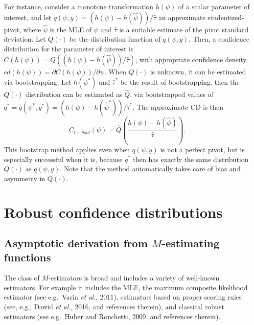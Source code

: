 \documentclass[preprint,12pt,authoryear]{elsarticle}
\begin{document}
For instance, consider  a monotone transformation $h(\psi)$ of a scalar parameter of interest, and let  $q(\psi,y)=(h( \psi)- h(\hat\psi))/\hat\tau$  an approximate studentized-pivot, where $\hat \psi$ is the MLE of $\psi$  and $\hat \tau$ is a suitable estimate of the pivot standard deviation. Let $Q(\cdot)$ be the distribution function of $q(\psi,y)$. Then, a confidence distribution  for the parameter of interest is   $C(h(\psi)) = Q \left((h(\psi)- h(\hat \psi))/\hat\tau \right)$, with appropriate confidence density $cd(h(\psi))=\partial C(h(\psi))/\partial \psi$. When $Q(\cdot)$ is unknown, it can be estimated via bootstrapping. Let $h(\psi^*)$ and $\hat\tau^*$ be the result of bootstrapping, then the $Q(\cdot)$ distribution can be estimated as $\hat Q$, via bootstrapped values of $q^* = q(\psi^*, y^*)=(h(\psi)- h(\hat \psi^*))/\hat\tau^*$. The approximate CD is then 
$$
C_{t-boot} (\psi) = \hat Q \left( \frac{h(\psi)- h(\hat \psi)}{\hat\tau} \right).
$$
This bootstrap method applies even when $q(\psi,y)$ is not a perfect pivot, but is especially successful when it is, because $q^*$ then has exactly the same distribution $Q(\cdot)$ as $q(\psi,y)$. Note that the method automatically takes care of bias and asymmetry in $Q(\cdot)$.



\section{Robust confidence distributions}

\subsection{Asymptotic derivation from $M$-estimating functions}

The class of $M$-estimators is broad and includes a variety of well-known estimators. For example  it includes the MLE, the maximum composite likelihood estimator (see e.g.\ Varin {\em et al.}, 2011), estimators based on proper scoring rules (see, e.g., Dawid {\em et al.}, 2016, and references therein), and classical robust estimators (see e.g.\ Huber and Ronchetti, 2009, and references therein).
\end{document}
